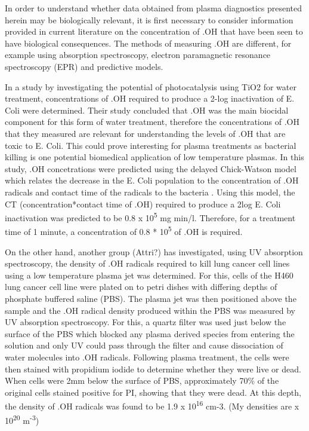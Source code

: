 \documentclass[11pt, oneside]{article}   	%
\begin{document}
In order to understand whether data obtained from plasma diagnostics presented herein may be biologically relevant, it is first necessary to consider information provided in current literature on the concentration of .OH that have been seen to have biological consequences. The methods of measuring .OH are different, for example using absorption spectroscopy, electron paramagnetic resonance spectroscopy (EPR) and predictive models.

In a study by \cite{Cho2004} investigating the potential of photocatalysis using TiO2 for water treatment, concentrations of .OH required to produce a 2-log inactivation of E. Coli were determined. Their study concluded that .OH was the main biocidal component for this form of water treatment, therefore the concentrations of .OH that they measured are relevant for understanding the levels of .OH that are toxic to E. Coli. This could prove interesting for plasma treatments as bacterial killing is one potential biomedical application of low temperature plasmas. 
In this study, .OH concetrations were predicted using the delayed Chick-Watson model which relates the decrease in the E. Coli population to the concentration of .OH radicals and contact time of the radicals to the bacteria \cite{Cho2003}. Using this model, the CT (concentration*contact time of .OH) required to produce a 2log E. Coli inactivation was predicted to be 0.8 x 10\textsuperscript{5} mg min/l.  Therefore, for a treatment time of 1 minute, a concentration of 0.8 * 10\textsuperscript{5} of .OH is required. 

On the other hand, another group (Attri?) has investigated, using UV absorption spectroscopy, the density of .OH radicals required to kill lung cancer cell lines using a low temperature plasma jet was determined. For this, cells of the H460 lung cancer cell line were plated on to petri dishes with differing depths of phosphate buffered saline (PBS). The plasma jet was then positioned above the sample and the .OH radical density produced within the PBS was measured by UV absorption spectroscopy. For this, a quartz filter was used just below the surface of the PBS which blocked any plasma derived species from entering the solution and only UV could pass through the filter and cause dissociation of water molecules into .OH radicals. Following plasma treatment, the cells were then stained with propidium iodide to determine whether they were live or dead. When cells were 2mm below the surface of PBS, approximately 70\% of the original cells stained positive for PI, showing that they were dead.  At this depth, the density of .OH radicals was found to be 1.9 x 10\textsuperscript{16} cm-3.  (My densities are x 10\textsuperscript{20} m\textsuperscript{-3})
\end{document}
